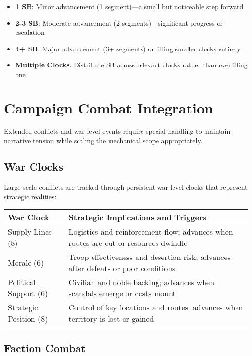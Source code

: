 \begin{itemize}
    \item \textbf{1 SB}: Minor advancement (1 segment)---a small but noticeable step forward
    \item \textbf{2-3 SB}: Moderate advancement (2 segments)---significant progress or escalation
    \item \textbf{4+ SB}: Major advancement (3+ segments) or filling smaller clocks entirely
    \item \textbf{Multiple Clocks}: Distribute SB across relevant clocks rather than overfilling one
\end{itemize}

\section*{Campaign Combat Integration}

Extended conflicts and war-level events require special handling to maintain narrative tension while scaling the mechanical scope appropriately.

\subsection*{War Clocks}

Large-scale conflicts are tracked through persistent war-level clocks that represent strategic realities:

\begin{fatebox}
\begin{tabularx}{\textwidth}{lX}
\toprule
\textbf{War Clock} & \textbf{Strategic Implications and Triggers} \\
\midrule
Supply Lines (8) & Logistics and reinforcement flow; advances when routes are cut or resources dwindle \\
Morale (6) & Troop effectiveness and desertion risk; advances after defeats or poor conditions \\
Political Support (6) & Civilian and noble backing; advances when scandals emerge or costs mount \\
Strategic Position (8) & Control of key locations and routes; advances when territory is lost or gained \\
\bottomrule
\end{tabularx}
\end{fatebox}

\subsection*{Faction Combat}

